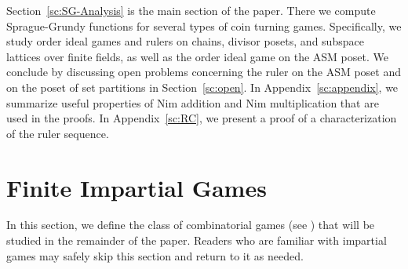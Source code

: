 \documentclass[a4paper,11pt]{amsart}
\theoremstyle{definition}
\numberwithin{equation}{section}
\begin{document}
Section~\ref{sc:SG-Analysis} is the main section of the paper. There we compute Sprague-Grundy functions for several types of coin turning games.
Specifically, we study order ideal games and rulers on chains, divisor posets, 
and subspace lattices over finite fields, as well as the order ideal game on the ASM poset.
We conclude by discussing open problems concerning the ruler on the ASM poset and on the poset of set partitions in Section~\ref{sc:open}.
In Appendix~\ref{sc:appendix},
we summarize useful properties of Nim addition and Nim multiplication that are used in the proofs.
In Appendix~\ref{sc:RC},
we present a proof of a characterization of the ruler sequence.
%

%
%
%
%
%
\section{Finite Impartial Games}\label{sec:ImpartialGames}
%
In this section, we define the class of combinatorial games (see \cite{MHRG,WW,ONAG,Sato,Siegel})
that will be studied in the remainder of the paper.
Readers who are familiar with impartial games may safely skip this section and return to it as needed.
%
%
\end{document}
